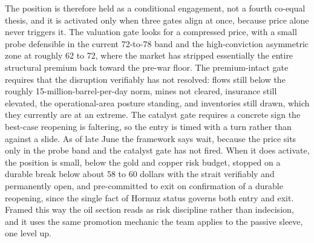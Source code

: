\documentclass[11pt,a4paper]{article}
\begin{document}
The position is therefore held as a conditional engagement, not a fourth co-equal thesis, and it is activated only when three gates align at once, because price alone never triggers it. The valuation gate looks for a compressed price, with a small probe defensible in the current 72-to-78 band and the high-conviction asymmetric zone at roughly 62 to 72, where the market has stripped essentially the entire structural premium back toward the pre-war floor. The premium-intact gate requires that the disruption verifiably has not resolved: flows still below the roughly 15-million-barrel-per-day norm, mines not cleared, insurance still elevated, the operational-area posture standing, and inventories still drawn, which they currently are at an extreme. The catalyst gate requires a concrete sign the best-case reopening is faltering, so the entry is timed with a turn rather than against a slide. As of late June the framework says wait, because the price sits only in the probe band and the catalyst gate has not fired. When it does activate, the position is small, below the gold and copper risk budget, stopped on a durable break below about 58 to 60 dollars with the strait verifiably and permanently open, and pre-committed to exit on confirmation of a durable reopening, since the single fact of Hormuz status governs both entry and exit. Framed this way the oil section reads as risk discipline rather than indecision, and it uses the same promotion mechanic the team applies to the passive sleeve, one level up.
\end{document}
